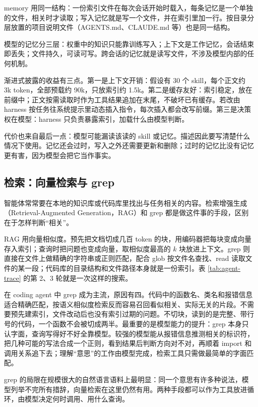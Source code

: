 memory 用同一结构：一份索引文件在每次会话开始时载入，每条记忆是一个单独的文件，相关时才读取；写入记忆就是写一个文件，并在索引里加一行。按目录分层放置的项目说明文件（AGENTS.md、CLAUDE.md 等）也是同一结构。

模型的记忆分三层：权重中的知识只能靠训练写入；上下文是工作记忆，会话结束即丢失；文件持久，可读可写。跨会话的记忆就是读写文件，不涉及模型内部的任何机制。

渐进式披露的收益有三点。第一是上下文开销：假设有 30 个 skill，每个正文约 3k token，全部预载约 90k，只放索引约 1.5k。第二是缓存友好：索引稳定，放在前缀中；正文按需读取时作为工具结果追加在末尾，不破坏已有缓存。若改由 harness 按任务往系统提示里动态插入指令，每次插入都会改写前缀。第三是决策权在模型：harness 只负责暴露索引，加载什么由模型判断。

代价也来自最后一点：模型可能漏读该读的 skill 或记忆。描述因此要写清楚什么情况下使用。记忆还会过时，写入之外还需要更新和删除；过时的记忆比没有记忆更有害，因为模型会把它当作事实。

\subsection{检索：向量检索与 grep}
\label{sec:agent-search}

智能体常常要在本地的知识库或代码库里找出与任务相关的内容。检索增强生成（Retrieval-Augmented Generation，RAG）和 grep 都是做这件事的手段，区别在于怎样判断“相关”。

RAG 用向量相似度。预先把文档切成几百 token 的块，用编码器把每块变成向量存入索引；查询时把问题也变成向量，取相似度最高的 \(k\) 块放进上下文。grep 则直接在文件上做精确的字符串或正则匹配，配合 glob 按文件名查找、read 读取文件的某一段；代码库的目录结构和文件路径本身就是一份索引。表 \ref{tab:agent-trace} 的第 2、3 轮就是一次这样的搜索。

在 coding agent 中 grep 成为主流，原因有四。代码中的函数名、类名和报错信息适合精确匹配，按语义相似度检索反而容易召回看似相关、实际无关的片段。不需要预先建索引，文件改动后也没有索引过期的问题。不切块，读到的是完整、带行号的代码，一个函数不会被切成两半。最重要的是模型能力的提升：grep 本身只认字面，查询写得好不好全靠模型。较强的模型能从报错信息推测相关的标识符，把几种可能的写法合成一个正则，看到结果后判断方向对不对，再顺着 import 和调用关系追下去；理解“意思”的工作由模型完成，检索工具只需做最简单的字面匹配。

grep 的局限在规模很大的自然语言语料上最明显：同一个意思有许多种说法，模型列举不完所有措辞，向量检索在这里仍然有用。两种手段都可以作为工具放进循环，由模型决定何时调用、用什么查询。

